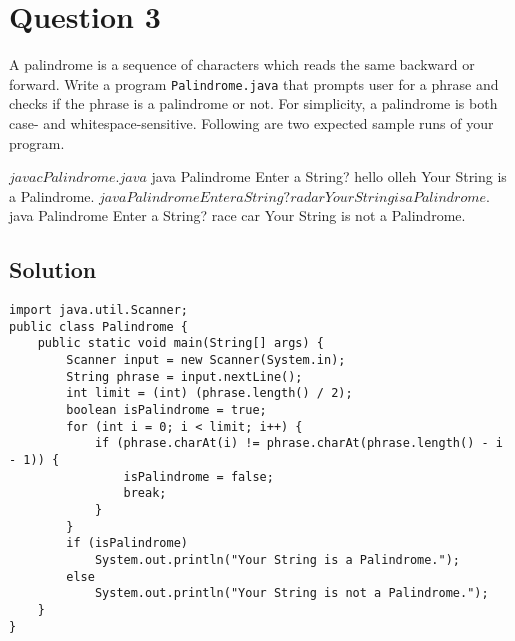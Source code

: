 \documentclass[12pt,letterpaper,twoside]{article}
\begin{document}
\newpage

\section*{Question 3}

A palindrome is a sequence of characters which reads the same backward or forward.
Write a program \texttt{Palindrome.java} that prompts user for a phrase and checks if the phrase is a palindrome or not.
For simplicity, a palindrome is both case- and whitespace-sensitive.
Following are two expected sample runs of your program.

\begin{terminal}
$ javac Palindrome.java
$ java Palindrome
Enter a String? hello olleh
Your String is a Palindrome.
$ java Palindrome
Enter a String? radar
Your String is a Palindrome.
$ java Palindrome
Enter a String? race car
Your String is not a Palindrome.
\end{terminal}

\subsection*{Solution}
\lstset{language=Java,tabsize=2}
\begin{lstlisting}
import java.util.Scanner;
public class Palindrome {
	public static void main(String[] args) {
		Scanner input = new Scanner(System.in);
		String phrase = input.nextLine();
		int limit = (int) (phrase.length() / 2);
		boolean isPalindrome = true;
		for (int i = 0; i < limit; i++) {
			if (phrase.charAt(i) != phrase.charAt(phrase.length() - i - 1)) {
				isPalindrome = false;
				break;
			}
		}
		if (isPalindrome)
			System.out.println("Your String is a Palindrome.");
		else
			System.out.println("Your String is not a Palindrome.");
	}
}
\end{lstlisting}
\end{document}
